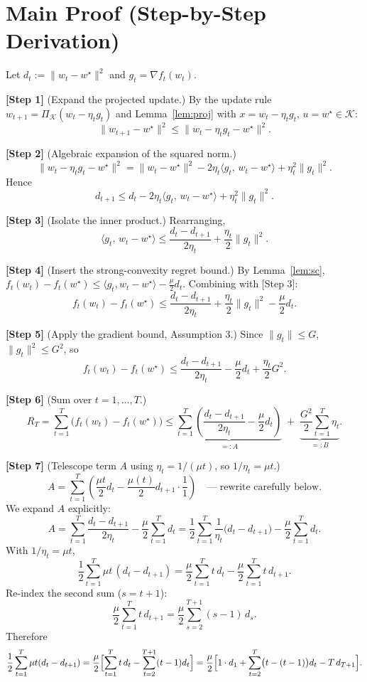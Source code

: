 \documentclass[11pt]{article}
\begin{document}
\section*{Main Proof (Step-by-Step Derivation)}

Let $d_t := \|w_t - w^\star\|^2$ and $g_t = \nabla f_t(w_t)$.

\medskip
\noindent\textbf{[Step 1]} (Expand the projected update.)
By the update rule $w_{t+1} = \Pi_{\mathcal{K}}(w_t - \eta_t g_t)$ and 
Lemma~\ref{lem:proj} with $x = w_t - \eta_t g_t$, $u = w^\star\in\mathcal{K}$:
\[
\|w_{t+1} - w^\star\|^2 \le \|w_t - \eta_t g_t - w^\star\|^2 .
\]

\noindent\textbf{[Step 2]} (Algebraic expansion of the squared norm.)
\[
\|w_t - \eta_t g_t - w^\star\|^2 
= \|w_t - w^\star\|^2 - 2\eta_t \langle g_t,\, w_t - w^\star\rangle + \eta_t^2 \|g_t\|^2 .
\]
Hence
\[
d_{t+1} \le d_t - 2\eta_t \langle g_t,\, w_t - w^\star\rangle + \eta_t^2 \|g_t\|^2 .
\]

\noindent\textbf{[Step 3]} (Isolate the inner product.)
Rearranging,
\[
\langle g_t,\, w_t - w^\star\rangle 
\le \frac{d_t - d_{t+1}}{2\eta_t} + \frac{\eta_t}{2}\|g_t\|^2 .
\]

\noindent\textbf{[Step 4]} (Insert the strong-convexity regret bound.)
By Lemma~\ref{lem:sc}, $f_t(w_t)-f_t(w^\star) \le \langle g_t, w_t-w^\star\rangle - \frac{\mu}{2}d_t$.
Combining with [Step 3]:
\[
f_t(w_t) - f_t(w^\star)
\le \frac{d_t - d_{t+1}}{2\eta_t} + \frac{\eta_t}{2}\|g_t\|^2 - \frac{\mu}{2} d_t .
\]

\noindent\textbf{[Step 5]} (Apply the gradient bound, Assumption 3.)
Since $\|g_t\|\le G$, $\|g_t\|^2 \le G^2$, so
\[
f_t(w_t) - f_t(w^\star)
\le \frac{d_t - d_{t+1}}{2\eta_t} - \frac{\mu}{2} d_t + \frac{\eta_t}{2} G^2 .
\]

\noindent\textbf{[Step 6]} (Sum over $t = 1,\dots,T$.)
\[
R_T = \sum_{t=1}^T \bigl(f_t(w_t) - f_t(w^\star)\bigr)
\le \underbrace{\sum_{t=1}^T \left( \frac{d_t - d_{t+1}}{2\eta_t} - \frac{\mu}{2} d_t \right)}_{=:A}
\;+\; \underbrace{\frac{G^2}{2}\sum_{t=1}^T \eta_t}_{=:B}.
\]

\noindent\textbf{[Step 7]} (Telescope term $A$ using $\eta_t = 1/(\mu t)$, so $1/\eta_t = \mu t$.)
\[
A = \sum_{t=1}^T \left( \frac{\mu t}{2} d_t - \frac{\mu(t)}{2} d_{t+1}\cdot\frac{1}{1}  \right)
\quad\text{— rewrite carefully below.}
\]
We expand $A$ explicitly:
\[
A = \sum_{t=1}^T \frac{d_t - d_{t+1}}{2\eta_t} - \frac{\mu}{2}\sum_{t=1}^T d_t
  = \frac{1}{2}\sum_{t=1}^T \frac{1}{\eta_t}\bigl(d_t - d_{t+1}\bigr) - \frac{\mu}{2}\sum_{t=1}^T d_t .
\]
With $1/\eta_t = \mu t$,
\[
\frac{1}{2}\sum_{t=1}^T \mu t\,(d_t - d_{t+1})
= \frac{\mu}{2}\sum_{t=1}^T t\,d_t - \frac{\mu}{2}\sum_{t=1}^T t\,d_{t+1}.
\]
Re-index the second sum ($s=t+1$):
\[
\frac{\mu}{2}\sum_{t=1}^T t\,d_{t+1} = \frac{\mu}{2}\sum_{s=2}^{T+1} (s-1)\,d_{s}.
\]
Therefore
\[
\frac{1}{2}\sum_{t=1}^T \mu t (d_t - d_{t+1})
= \frac{\mu}{2}\Bigl[ \sum_{t=1}^T t\,d_t - \sum_{t=2}^{T+1}(t-1)d_t \Bigr]
= \frac{\mu}{2}\Bigl[ 1\cdot d_1 + \sum_{t=2}^{T} \bigl(t-(t-1)\bigr)d_t - T\,d_{T+1} \Bigr].
\]
\end{document}
